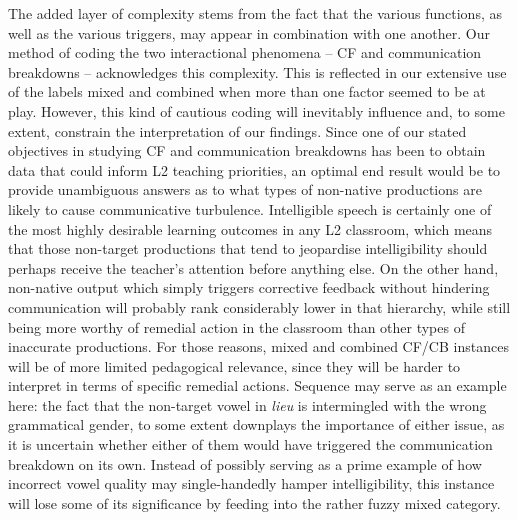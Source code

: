 \documentclass[output=paper,colorlinks,citecolor=brown,modfonts,nonflat]{../langscibook}
\begin{document}
\largerpage
The added layer of complexity stems from the fact that the various functions, as well as the various triggers, may appear in combination with one another. Our method of coding the two interactional phenomena – CF and communication breakdowns – acknowledges this complexity. This is reflected in our extensive use of the labels mixed and combined when more than one factor seemed to be at play. However, this kind of cautious coding will inevitably influence and, to some extent, constrain the interpretation of our findings. Since one of our stated objectives in studying CF and communication breakdowns has been to obtain data that could inform L2 teaching priorities, an optimal end result would be to provide unambiguous answers as to what types of non-native productions are likely to cause communicative turbulence. Intelligible speech is certainly one of the most highly desirable learning outcomes in any L2 classroom, which means that those non-target productions that tend to jeopardise intelligibility should perhaps receive the teacher’s attention before anything else. On the other hand, non-native output which simply triggers corrective feedback without hindering communication will probably rank considerably lower in that hierarchy, while still being more worthy of remedial action in the classroom than other types of inaccurate productions. For those reasons, mixed and combined CF/CB instances will be of more limited pedagogical relevance, since they will be harder to interpret in terms of specific remedial actions. Sequence  may serve as an example here: the fact that the non-target vowel in \textit{lieu} is intermingled with the wrong grammatical gender, to some extent downplays the importance of either issue, as it is uncertain whether either of them would have triggered the communication breakdown on its own. Instead of possibly serving as a prime example of how incorrect vowel quality may single-handedly hamper intelligibility, this instance will lose some of its significance by feeding into the rather fuzzy mixed category.
\end{document}
